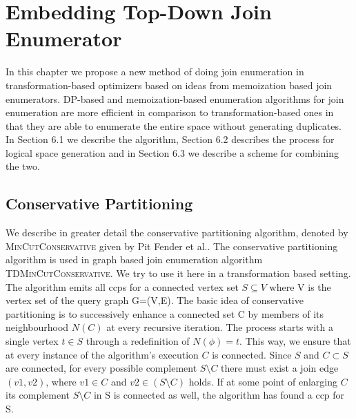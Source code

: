 \chapter{Embedding Top-Down Join Enumerator}
\label{topdownint}
In this chapter we propose a new method of doing join enumeration in transformation-based optimizers based on ideas from memoization based join enumerators. DP-based and memoization-based enumeration algorithms\cite{fender2011new,fender2012effective,fender2013top} for join enumeration are more efficient in comparison to transformation-based ones in that they are able to enumerate the entire space without generating duplicates. 
In Section 6.1 we describe the algorithm, Section 6.2 describes the process for logical space generation and in  
Section 6.3 we describe a scheme for combining the two. 

\section{Conservative Partitioning}
\label{conservativePartitioning}
We describe in greater detail the conservative partitioning algorithm, denoted by \textsc{MinCutConservative} given by Pit Fender et al.\cite{fender2012effective}. The conservative partitioning algorithm is used in graph based join enumeration algorithm \textsc{TDMinCutConservative}. We try to use it here in a transformation based setting. \\

The algorithm emits all ccps for a connected vertex set $S \subseteq V$ where V is the vertex set of the query graph G=(V,E). The basic idea of conservative partitioning is to successively enhance a connected set C by members of its neighbourhood $N(C)$ at every recursive iteration. The process starts with a single vertex $t \in S$ through a redefinition of $N(\phi) = {t}$. This way, we ensure that at every instance of the algorithm's execution $C$ is connected. Since $S$ and $C \subset S$ are connected, for every possible complement $S \setminus C$ there must exist a join edge $(v1, v2)$, where $v1 \in C$ and $v2 \in (S \setminus C)$ holds. If at some point of enlarging $C$ its complement $S \setminus C$ in S is connected as well, the algorithm has found a ccp for S. \\

